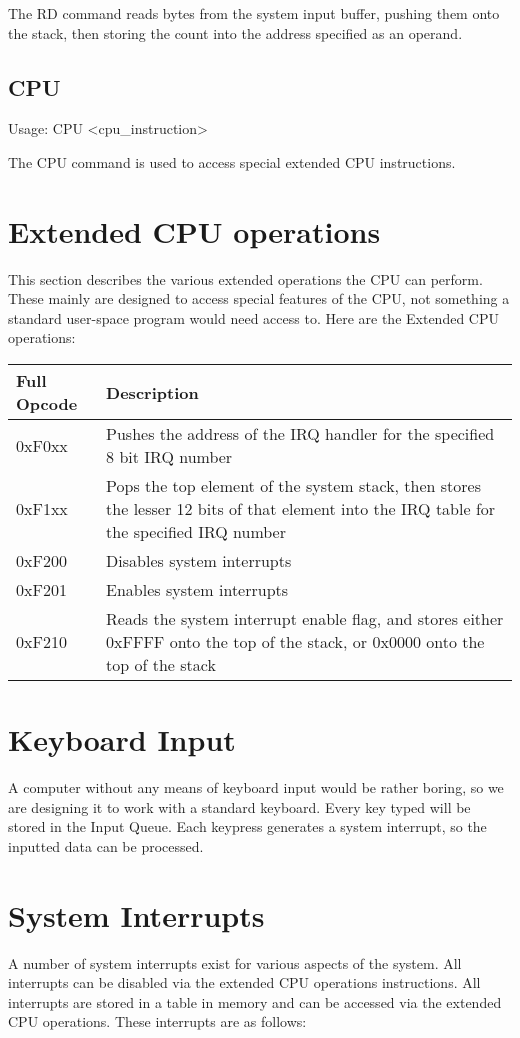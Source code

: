 \documentclass{book}
\begin{document}
  The RD command reads bytes from the system input buffer, pushing them onto the stack, then storing
  the count into the address specified as an operand.

\subsection{CPU}
  Usage: CPU \textless cpu\_instruction\textgreater 

  The CPU command is used to access special extended CPU instructions.

\section{Extended CPU operations}
This section describes the various extended operations the CPU can perform. These mainly are designed
to access special features of the CPU, not something a standard user-space program would need access to.
Here are the Extended CPU operations:

\begin{tabular}{|p{3cm}|p{10cm}|}
  \hline
  \textbf{Full Opcode} & \textbf{Description} \\
  \hline
  0xF0xx & Pushes the address of the IRQ handler for the specified 8 bit IRQ number \\
  0xF1xx & Pops the top element of the system stack, then stores the lesser 12 bits of that element into
           the IRQ table for the specified IRQ number \\
  0xF200 & Disables system interrupts \\
  0xF201 & Enables system interrupts \\
  0xF210 & Reads the system interrupt enable flag, and stores either 0xFFFF onto the top of the stack, or
           0x0000 onto the top of the stack \\
\end{tabular}

\section{Keyboard Input}
A computer without any means of keyboard input would be rather boring, so we are designing it to work with
a standard keyboard. Every key typed will be stored in the Input Queue. Each keypress generates a system
interrupt, so the inputted data can be processed.

\section{System Interrupts}
A number of system interrupts exist for various aspects of the system. All interrupts can be disabled via
the extended CPU operations instructions. All interrupts are stored in a table in memory and can be accessed
via the extended CPU operations. These interrupts are as follows:
\end{document}

